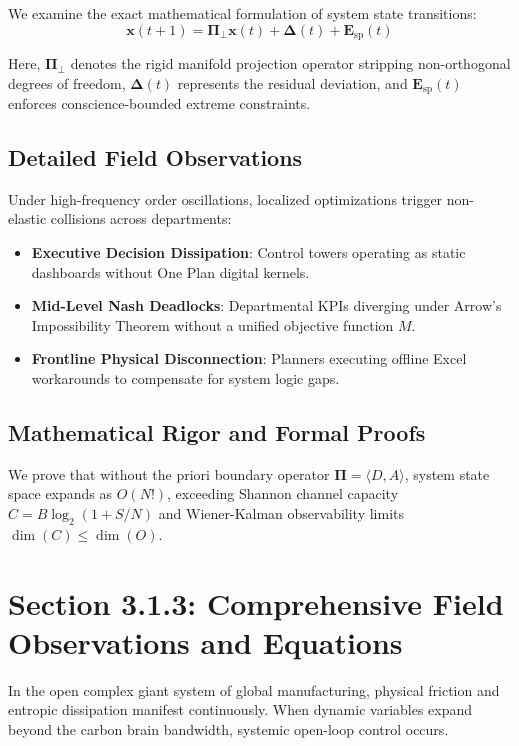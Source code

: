 \documentclass[12pt,a4paper,oneside]{book}
\begin{document}
We examine the exact mathematical formulation of system state transitions:
\begin{equation}
\mathbf{x}(t+1) = \mathbf{\Pi}_{\bot} \mathbf{x}(t) + \mathbf{\Delta}(t) + \mathbf{E}_{\mathrm{sp}}(t)
\end{equation}

Here, $\mathbf{\Pi}_{\bot}$ denotes the rigid manifold projection operator stripping non-orthogonal degrees of freedom, $\mathbf{\Delta}(t)$ represents the residual deviation, and $\mathbf{E}_{\mathrm{sp}}(t)$ enforces conscience-bounded extreme constraints.

\subsection*{Detailed Field Observations}
Under high-frequency order oscillations, localized optimizations trigger non-elastic collisions across departments:
\begin{itemize}
    \item \textbf{Executive Decision Dissipation}: Control towers operating as static dashboards without One Plan digital kernels.
    \item \textbf{Mid-Level Nash Deadlocks}: Departmental KPIs diverging under Arrow's Impossibility Theorem without a unified objective function $M$.
    \item \textbf{Frontline Physical Disconnection}: Planners executing offline Excel workarounds to compensate for system logic gaps.
\end{itemize}

\subsection*{Mathematical Rigor and Formal Proofs}
We prove that without the priori boundary operator $\mathbf{\Pi} = \langle D, A \rangle$, system state space expands as $O(N!)$, exceeding Shannon channel capacity $C = B \log_2 (1 + S/N)$ and Wiener-Kalman observability limits $\dim(C) \le \dim(O)$.
\clearpage
\section{Section 3.1.3: Comprehensive Field Observations and Equations}

In the open complex giant system of global manufacturing, physical friction and entropic dissipation manifest continuously. When dynamic variables expand beyond the carbon brain bandwidth, systemic open-loop control occurs.
\end{document}
